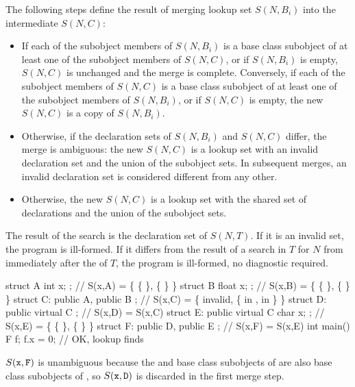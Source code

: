 \pnum
The following steps define the result of merging lookup set $S(N,B_i)$
into the intermediate $S(N,C)$:

\begin{itemize}
\item If each of the subobject members of $S(N,B_i)$ is a base class
subobject of at least one of the subobject members of $S(N,C)$, or if
$S(N,B_i)$ is empty, $S(N,C)$ is unchanged and the merge is complete.
Conversely, if each of the subobject members of $S(N,C)$ is a base class
subobject of at least one of the subobject members of $S(N,B_i)$, or if
$S(N,C)$ is empty, the new $S(N,C)$ is a copy of $S(N,B_i)$.

\item Otherwise, if the declaration sets of $S(N,B_i)$ and $S(N,C)$
differ, the merge is ambiguous: the new $S(N,C)$ is a lookup set with an
invalid declaration set and the union of the subobject sets. In
subsequent merges, an invalid declaration set is considered different
from any other.

\item Otherwise, the new $S(N,C)$ is a lookup set with the shared set of
declarations and the union of the subobject sets.
\end{itemize}

\pnum
The result of the search is the declaration set of $S(N,T)$.
If it is an invalid set, the program is ill-formed.
If it differs from the result of a search in $T$ for $N$
from immediately after the  of $T$,
the program is ill-formed, no diagnostic required.
\begin{example}
\begin{codeblock}
struct A { int x; };                    // S(x,A) = \{ \{  \}, \{  \} \}
struct B { float x; };                  // S(x,B) = \{ \{  \}, \{  \} \}
struct C: public A, public B { };       // S(x,C) = \{ invalid, \{  in ,  in  \} \}
struct D: public virtual C { };         // S(x,D) = S(x,C)
struct E: public virtual C { char x; }; // S(x,E) = \{ \{  \}, \{  \} \}
struct F: public D, public E { };       // S(x,F) = S(x,E)
int main() {
  F f;
  f.x = 0;                              // OK, lookup finds 
}
\end{codeblock}

$S(\texttt{x},\texttt{F})$ is unambiguous because the  and  base
class subobjects of  are also base class subobjects of , so
$S(\texttt{x},\texttt{D})$ is discarded in the first merge step.
\end{example}

